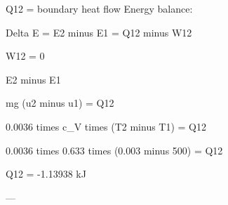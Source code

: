 Q12 = boundary heat flow  
Energy balance:  

Delta E = E2 minus E1 = Q12 minus W12  

W12 = 0  

E2 minus E1  

mg (u2 minus u1) = Q12  

0.0036 times c_V times (T2 minus T1) = Q12  

0.0036 times 0.633 times (0.003 minus 500) = Q12  

Q12 = -1.13938 kJ  

---